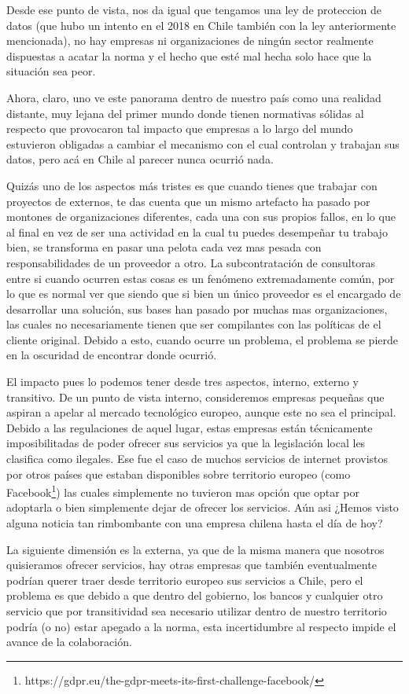 \documentclass[11pt]{utalcaDoc}
\begin{document}
Desde ese punto de vista, nos da igual que tengamos una ley de proteccion de datos (que hubo un intento en el 2018 en Chile también con la ley anteriormente mencionada), no hay empresas ni organizaciones de ningún sector realmente dispuestas a acatar la norma y el hecho que esté mal hecha solo hace que la situación sea peor.

Ahora, claro, uno ve este panorama dentro de nuestro país como una realidad distante, muy lejana del primer mundo donde tienen normativas sólidas al respecto que provocaron tal impacto que empresas a lo largo del mundo estuvieron obligadas a cambiar el mecanismo con el cual controlan y trabajan sus datos, pero acá en Chile al parecer nunca ocurrió nada.

Quizás uno de los aspectos más tristes es que cuando tienes que trabajar con proyectos de externos, te das cuenta que un mismo artefacto ha pasado por montones de organizaciones diferentes, cada una con sus propios fallos, en lo que al final en vez de ser una actividad en la cual tu puedes desempeñar tu trabajo bien, se transforma en pasar una pelota cada vez mas pesada con responsabilidades de un proveedor a otro. La subcontratación de consultoras entre si cuando ocurren estas cosas es un fenómeno extremadamente común, por lo que es normal ver que siendo que si bien un único proveedor es el encargado de desarrollar una solución, sus bases han pasado por muchas mas organizaciones, las cuales no necesariamente tienen que ser compilantes con las políticas de el cliente original. Debido a esto, cuando ocurre un problema, el problema se pierde en la oscuridad de encontrar donde ocurrió.

El impacto pues lo podemos tener desde tres aspectos, interno, externo y transitivo. De un punto de vista interno, consideremos empresas pequeñas que aspiran a apelar al mercado tecnológico europeo, aunque este no sea el principal. Debido a las regulaciones de aquel lugar, estas empresas están técnicamente imposibilitadas de poder ofrecer sus servicios ya que la legislación local les clasifica como ilegales. Ese fue el caso de muchos servicios de internet provistos por otros países que estaban disponibles sobre territorio europeo (como Facebook\footnote{https://gdpr.eu/the-gdpr-meets-its-first-challenge-facebook/}) las cuales simplemente no tuvieron mas opción que optar por adoptarla o bien simplemente dejar de ofrecer los servicios. Aún asi ¿Hemos visto alguna noticia tan rimbombante con una empresa chilena hasta el día de hoy?

La siguiente dimensión es la externa, ya que de la misma manera que nosotros quisieramos ofrecer servicios, hay otras empresas que también eventualmente podrían querer traer desde territorio europeo sus servicios a Chile, pero el problema es que debido a que dentro del gobierno, los bancos y cualquier otro servicio que por transitividad sea necesario utilizar dentro de nuestro territorio podría (o no) estar apegado a la norma, esta incertidumbre al respecto impide el avance de la colaboración. 
\end{document}
